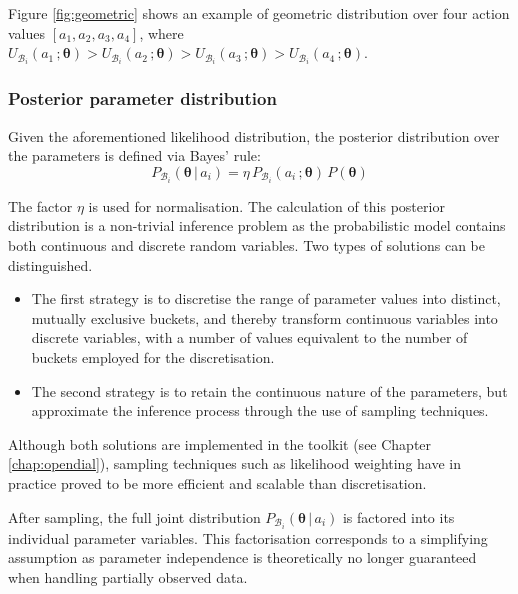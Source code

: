 Figure \ref{fig:geometric} shows an example of geometric distribution over four action values $[a_1, a_2, a_3, a_4]$, where $U_{\mathcal{B}_i}(a_1\,; \boldsymbol\theta) > U_{\mathcal{B}_i}(a_2\,; \boldsymbol\theta) > U_{\mathcal{B}_i}(a_3\,; \boldsymbol\theta) > U_{\mathcal{B}_i}(a_4\,; \boldsymbol\theta)$.


\subsubsection*{Posterior parameter distribution}
Given the aforementioned likelihood distribution, the posterior distribution over the parameters is defined via Bayes' rule: 
\begin{equation}
P_{\mathcal{B}_i}(\boldsymbol\theta \, | \, a_i) = \eta \, P_{\mathcal{B}_i}(a_i\,; \boldsymbol\theta) \, P(\boldsymbol\theta ) \label{eq:paramposterior}
\end{equation}

The factor $\eta$ is used for normalisation. The calculation of this posterior distribution is a non-trivial inference problem as the probabilistic model contains both continuous and discrete random variables.  Two types of solutions can be distinguished. \begin{itemize}
\item The first strategy is to discretise the range of parameter values into distinct, mutually exclusive buckets, and thereby transform continuous variables into discrete variables, with a number of values equivalent to the number of buckets employed for the discretisation.
\item The second strategy is to retain the continuous nature of the parameters, but approximate the inference process through the use of sampling techniques.  
\end{itemize}
Although both solutions are implemented in the \opendial{} toolkit (see Chapter \ref{chap:opendial}), sampling techniques such as likelihood weighting have in practice proved to be more efficient and scalable than discretisation. 

After sampling, the full joint distribution $P_{\mathcal{B}_i}(\boldsymbol\theta \, | \, a_i)$ is factored into its individual parameter variables. This factorisation corresponds to a simplifying assumption as parameter independence is theoretically no longer guaranteed when handling partially observed data. 

